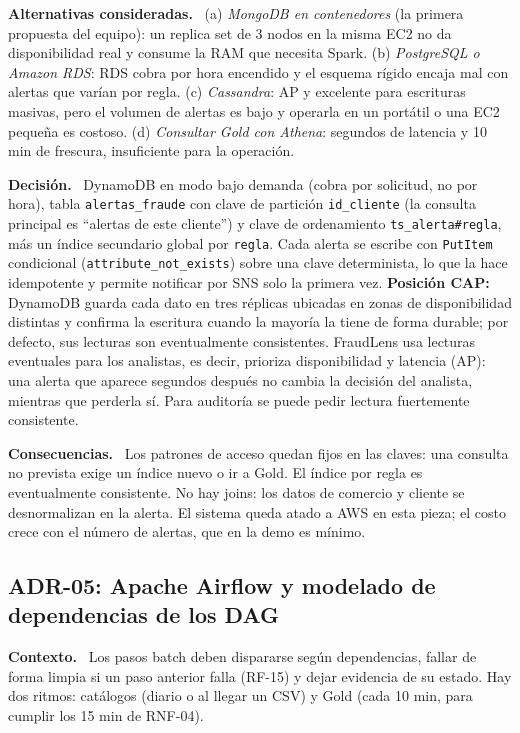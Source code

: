 \documentclass[12pt,letterpaper]{article}
\newcommand{\code}[1]{{\small\texttt{#1}}}
\newcommand{\adrpart}[1]{\textbf{#1.}~}
\begin{document}
\adrpart{Alternativas consideradas} (a) \emph{MongoDB en contenedores} (la primera propuesta del equipo): un replica set de 3 nodos en la misma EC2 no da disponibilidad real y consume la RAM que necesita Spark. (b) \emph{PostgreSQL o Amazon RDS}: RDS cobra por hora encendido y el esquema rígido encaja mal con alertas que varían por regla. (c) \emph{Cassandra}: AP y excelente para escrituras masivas, pero el volumen de alertas es bajo y operarla en un portátil o una EC2 pequeña es costoso. (d) \emph{Consultar Gold con Athena}: segundos de latencia y 10 min de frescura, insuficiente para la operación.

\adrpart{Decisión} DynamoDB en modo bajo demanda (cobra por solicitud, no por hora), tabla \code{alertas\_fraude} con clave de partición \code{id\_cliente} (la consulta principal es ``alertas de este cliente'') y clave de ordenamiento \code{ts\_alerta\#regla}, más un índice secundario global por \code{regla}. Cada alerta se escribe con \code{PutItem} condicional (\code{attribute\_not\_exists}) sobre una clave determinista, lo que la hace idempotente y permite notificar por SNS solo la primera vez. \textbf{Posición CAP:} DynamoDB guarda cada dato en tres réplicas ubicadas en zonas de disponibilidad distintas y confirma la escritura cuando la mayoría la tiene de forma durable; por defecto, sus lecturas son eventualmente consistentes. FraudLens usa lecturas eventuales para los analistas, es decir, prioriza disponibilidad y latencia (AP): una alerta que aparece segundos después no cambia la decisión del analista, mientras que perderla sí. Para auditoría se puede pedir lectura fuertemente consistente.

\adrpart{Consecuencias} Los patrones de acceso quedan fijos en las claves: una consulta no prevista exige un índice nuevo o ir a Gold. El índice por regla es eventualmente consistente. No hay joins: los datos de comercio y cliente se desnormalizan en la alerta. El sistema queda atado a AWS en esta pieza; el costo crece con el número de alertas, que en la demo es mínimo.

\subsection*{ADR-05: Apache Airflow y modelado de dependencias de los DAG}

\adrpart{Contexto} Los pasos batch deben dispararse según dependencias, fallar de forma limpia si un paso anterior falla (RF-15) y dejar evidencia de su estado. Hay dos ritmos: catálogos (diario o al llegar un CSV) y Gold (cada 10 min, para cumplir los 15 min de RNF-04).
\end{document}
